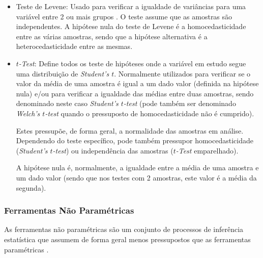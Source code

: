 \documentclass[conference]{IEEEtran}
\begin{document}
\begin{itemize}
    \item Teste de Levene: Usado para verificar a igualdade de variâncias para uma variável entre 2 ou mais grupos \cite{10.1137/1003016}.  O teste assume que as amostras são independentes.
A hipótese nula do teste de Levene é a homocedasticidade entre as várias amostras, sendo que a hipótese alternativa é a heterocedasticidade entre as mesmas.

    \item \textit{$t$-Test}: Define todos os teste de hipóteses onde a variável em estudo segue uma distribuição de \textit{Student's $t$}. Normalmente utilizados para verificar se o valor da média de uma amostra é igual a um dado valor (definida na hipótese nula) e/ou para verificar a igualdade das médias entre duas amostras, sendo denominado neste caso \textit{Student's $t$-test} (pode também ser denominado \textit{Welch's $t$-test} quando o pressuposto de homocedasticidade não é cumprido).

Estes pressupõe, de forma geral, a normalidade das amostras em análise. Dependendo do teste específico, pode também pressupor homocedasticidade (\textit{Student's $t$-test}) ou independência das amostras (\textit{$t$-Test} emparelhado).

A hipótese nula é, normalmente, a igualdade entre a média de uma amostra e um dado valor (sendo que nos testes com 2 amostras, este valor é a média da segunda).

\end{itemize}

\subsubsection{Ferramentas Não Paramétricas}

As ferramentas não paramétricas são um conjunto de processos de inferência estatística que assumem de forma geral menos pressupostos que as ferramentas paramétricas \cite{Vaart_2007}.
\end{document}
